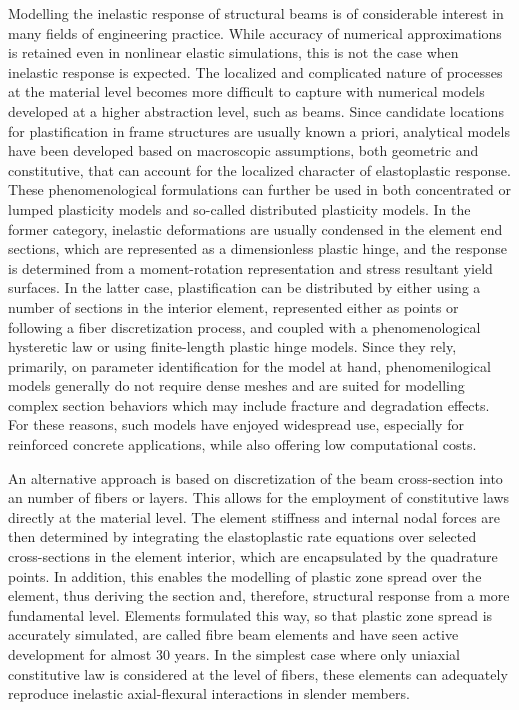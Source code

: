 Modelling the inelastic response of structural beams is of considerable
interest in many fields of engineering practice. While accuracy of
numerical approximations is retained even in nonlinear elastic 
simulations, this is not the case when inelastic response is expected. The 
localized and complicated nature of processes at the material level 
becomes more difficult to capture with numerical models developed at a 
higher abstraction level, such as beams. Since candidate locations for 
plastification in frame structures are usually known a priori, 
analytical models have been developed based on macroscopic assumptions, 
both geometric and 
constitutive, that can account for the localized character of
elastoplastic response. These phenomenological formulations can further be used 
in both concentrated or lumped plasticity models and so-called distributed 
plasticity models. In the former category, inelastic deformations are usually 
condensed in the element end sections, which are represented as a dimensionless 
plastic hinge, and the response is determined from a moment-rotation 
representation and stress resultant yield surfaces\cite{berry2008,lowes2003}. 
In the latter case, plastification can be distributed by either using a number 
of sections in the interior element, represented either as points or following 
a fiber discretization process, and coupled with a phenomenological hysteretic 
law\cite{Amir2020,amir2020hysteretic,KOTTARI2014,triantafyllou211,SimoShear} or 
using 
finite-length plastic hinge\cite{Scott1,Scott2,bae2008} models. Since they 
rely, primarily, on parameter identification for the model at hand, 
phenomenilogical models generally do not require dense meshes and are suited 
for modelling complex section behaviors which may include fracture and 
degradation effects. For these reasons, such models have 
enjoyed widespread use, especially for reinforced concrete applications, 
while also offering low computational 
costs.
  

An alternative approach is based on discretization of the beam cross-section
into an number of fibers or layers. This allows for the employment of 
constitutive laws directly at the material level. The element 
stiffness and internal nodal forces are then determined by integrating 
the elastoplastic rate equations over selected cross-sections in the element
interior, which are encapsulated by the quadrature points. In addition, 
this enables the
modelling of plastic zone spread over the element, thus deriving the section 
and, therefore, structural response from a more fundamental level. Elements 
formulated this way, so that plastic zone spread is accurately simulated,
are called fibre beam
elements\cite{Kaba1984,Zeris1988,Taucer1991,Spacone1992,Scordelis1984} and
have seen active development for almost 30 years. In the simplest case where
only uniaxial constitutive law is considered at the level of fibers, these
elements can adequately reproduce inelastic axial-flexural interactions in 
slender members. 

